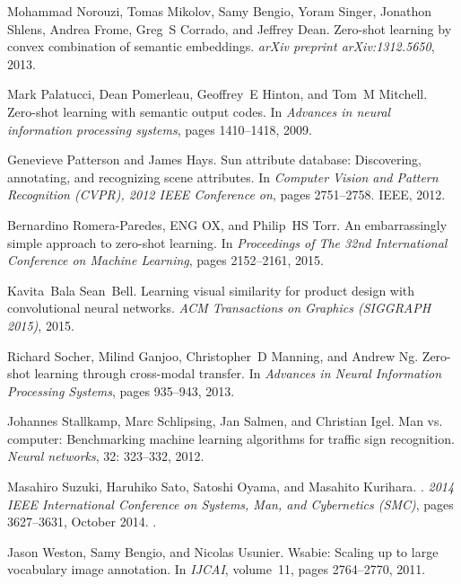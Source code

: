 \documentclass{bmvc2k}
\begin{document}
\begin{thebibliography}{23}
Mohammad Norouzi, Tomas Mikolov, Samy Bengio, Yoram Singer, Jonathon Shlens,
  Andrea Frome, Greg~S Corrado, and Jeffrey Dean.
\newblock Zero-shot learning by convex combination of semantic embeddings.
\newblock \emph{arXiv preprint arXiv:1312.5650}, 2013.

Mark Palatucci, Dean Pomerleau, Geoffrey~E Hinton, and Tom~M Mitchell.
\newblock Zero-shot learning with semantic output codes.
\newblock In \emph{Advances in neural information processing systems}, pages
  1410--1418, 2009.

Genevieve Patterson and James Hays.
\newblock Sun attribute database: Discovering, annotating, and recognizing
  scene attributes.
\newblock In \emph{Computer Vision and Pattern Recognition (CVPR), 2012 IEEE
  Conference on}, pages 2751--2758. IEEE, 2012.

Bernardino Romera-Paredes, ENG OX, and Philip~HS Torr.
\newblock An embarrassingly simple approach to zero-shot learning.
\newblock In \emph{Proceedings of The 32nd International Conference on Machine
  Learning}, pages 2152--2161, 2015.

Kavita~Bala Sean~Bell.
\newblock Learning visual similarity for product design with convolutional
  neural networks.
\newblock \emph{ACM Transactions on Graphics (SIGGRAPH 2015)}, 2015.

Richard Socher, Milind Ganjoo, Christopher~D Manning, and Andrew Ng.
\newblock Zero-shot learning through cross-modal transfer.
\newblock In \emph{Advances in Neural Information Processing Systems}, pages
  935--943, 2013.

Johannes Stallkamp, Marc Schlipsing, Jan Salmen, and Christian Igel.
\newblock Man vs. computer: Benchmarking machine learning algorithms for
  traffic sign recognition.
\newblock \emph{Neural networks}, 32: 323--332, 2012.

Masahiro Suzuki, Haruhiko Sato, Satoshi Oyama, and Masahito Kurihara.
.
\newblock \emph{2014 IEEE International Conference on Systems, Man, and
  Cybernetics (SMC)}, pages 3627--3631, October 2014.
\newblock {}.

Jason Weston, Samy Bengio, and Nicolas Usunier.
\newblock Wsabie: Scaling up to large vocabulary image annotation.
\newblock In \emph{IJCAI}, volume~11, pages 2764--2770, 2011.

\end{thebibliography}
\end{document}
